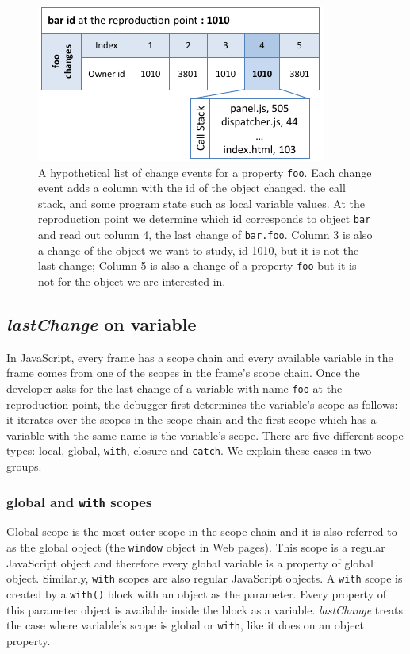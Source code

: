\documentclass{sig-alternate}
\begin{document}
\begin{figure}[htp]
\centering 
\includegraphics [width=.48\textwidth] {6-foo-changes1.pdf} %
\caption{A hypothetical list of  change events for a property \texttt{foo}. 
Each change event adds a column with the id of the object changed, the call stack,
and some program state such as local variable values. 
At the reproduction point  we determine which id  corresponds to 
object \texttt{bar} and read out column 4,  the last
  change of \texttt{bar.foo}. Column 3 is also a change of
  the object we want to study, id 1010, but it is not the last change;
  Column 5 is also a change of a property \texttt{foo} but it is not for
  the object we are interested in.}
\label{fig:foo-changes1}
\end{figure}

\subsection{{\large\bf\textit{lastChange}} on variable} 
In JavaScript, every frame has a scope chain and every available
variable in the frame comes from one of the scopes in the frame's
scope chain. Once the developer asks for the last change of a variable with name 
\texttt{foo} at the reproduction point, the debugger first determines the
variable's scope as follows: it iterates over the scopes in the scope
chain and the first scope which has a variable with the same name is
the variable's scope. There are five different scope types: local,
global, \texttt{with}, closure and \texttt{catch}. We explain these
cases in two groups.

\subsubsection{global and \texttt{with} scopes}
Global scope is the most outer scope in the scope chain and it is
also referred to as the global object (the \texttt{window}
object in Web pages). This scope is a regular JavaScript object and therefore every
global variable is a property of global object. Similarly,
 \texttt{with} scopes are also regular JavaScript objects. A \texttt{with}
scope is created by a \texttt{with()} block with an object as the
parameter. Every property of this parameter object is available inside the
block as a variable. \textit{lastChange} treats the case where variable's scope
is global or \texttt{with}, like it does on an object
property.
\end{document}
